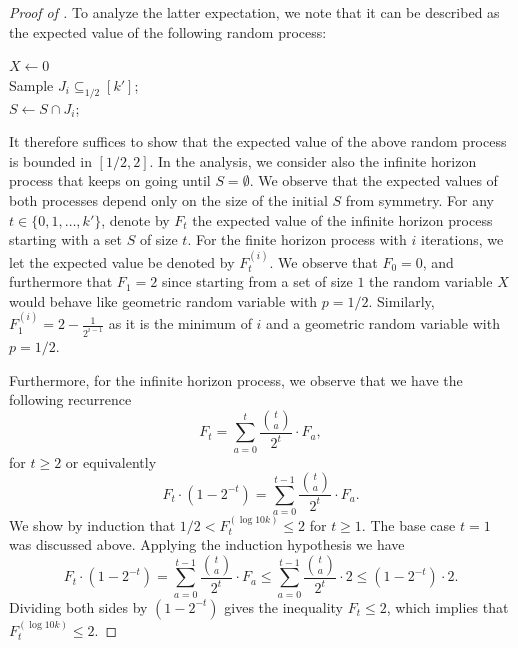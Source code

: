 \begin{proof}[Proof of ]
To analyze the latter expectation, we note that it can be described as the expected value of the following random process:\\
\begin{algorithm}[H]
\DontPrintSemicolon
$X \leftarrow 0$\\
   {
     Sample $J_i \subseteq_{1/2} [{k'}]$; \\
     $S \leftarrow S \cap J_i$; \\
	}
\end{algorithm}

It therefore suffices to show that the expected value of the above random process is bounded in $[1/2, 2]$.
In the analysis, we consider also the infinite horizon process that keeps on going until $S= \emptyset$.
We observe that the expected values of both processes depend only on the size of the initial $S$ from symmetry.
For any $t \in \{0,1, \ldots, {k'}\}$, denote by $F_{t}$ the expected value of the infinite horizon process starting with a set $S$ of size $t$.
For the finite horizon process with $i$ iterations, we let the expected value be denoted by $F_t^{(i)}$.
We observe that $F_0 = 0$, and furthermore that $F_1 = 2$ since starting from a set of size $1$ the random variable $X$ would behave like geometric random variable with $p=1/2$.
Similarly, 
$F_1^{(i)} = 2 - \frac{1}{2^{i - 1}}$  as it is the minimum of $i$ and a geometric random variable with $p=1/2$.

Furthermore, for the infinite horizon process, we observe that we have the following recurrence $$F_t = \sum_{a=0}^{t} \frac{\binom{t}{a}}{2^{t}} \cdot F_{a},$$
for $t\ge 2$ or equivalently
$$F_t\cdot (1-2^{-t}) = \sum_{a=0}^{t-1} \frac{\binom{t}{a}}{2^{t}} \cdot F_{a}.$$
We show by induction that $1/2< F_t^{(\log 10k)} \le 2$ for $t\ge 1$.
The base case $t=1$ was discussed above.
%
%
%
Applying the induction hypothesis we have 
$$
F_t\cdot (1-2^{-t}) = \sum_{a=0}^{t-1} \frac{\binom{t}{a}}{2^{t}} \cdot F_{a}
\le \sum_{a=0}^{t-1} \frac{\binom{t}{a}}{2^{t}} \cdot 2
\le (1-2^{-t}) \cdot 2.$$
Dividing both sides by $(1-2^{-t})$ gives the  inequality $F_t \le 2$, which implies that $F_t^{(\log 10k)}\leq 2$.


\end{proof}
